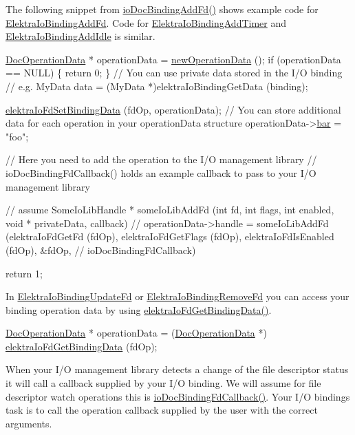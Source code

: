 The following snippet from \hyperlink{io__doc_8c_ae9b5f4e891829f3af8563e8160e1bd02}{io\+Doc\+Binding\+Add\+Fd()} shows example code for \hyperlink{kdbio_8h_addbfc876a15d0b8864196c67ab3e5a26}{Elektra\+Io\+Binding\+Add\+Fd}. Code for \hyperlink{kdbio_8h_a61a8f37e371b8360c92222f58f4691eb}{Elektra\+Io\+Binding\+Add\+Timer} and \hyperlink{kdbio_8h_adcfdf9f514441cabfbfd064fe4021522}{Elektra\+Io\+Binding\+Add\+Idle} is similar.


\begin{DoxyCodeInclude}
        \hyperlink{structDocOperationData}{DocOperationData} * operationData = \hyperlink{io__doc_8c_a18494b019c975b4212d39c9d83ff1e02}{newOperationData} ();
        \textcolor{keywordflow}{if} (operationData == NULL)
        \{
                \textcolor{keywordflow}{return} 0;
        \}
        \textcolor{comment}{// You can use private data stored in the I/O binding}
        \textcolor{comment}{// e.g. MyData data = (MyData *)elektraIoBindingGetData (binding);}

        \hyperlink{io_8c_ae02ec122aafa67b7dd92d9c3daa6499e}{elektraIoFdSetBindingData} (fdOp, operationData);
        \textcolor{comment}{// You can store additional data for each operation in your operationData structure}
        operationData->\hyperlink{structDocOperationData_aae15fddcc4a8c6e7a9faaebe4f9964ec}{bar} = \textcolor{stringliteral}{"foo"};

        \textcolor{comment}{// Here you need to add the operation to the I/O management library}
        \textcolor{comment}{// ioDocBindingFdCallback() holds an example callback to pass to your I/O management library}

        \textcolor{comment}{// assume SomeIoLibHandle * someIoLibAddFd (int fd, int flags, int enabled, void * privateData,
       callback)}
        \textcolor{comment}{// operationData->handle = someIoLibAddFd (elektraIoFdGetFd (fdOp), elektraIoFdGetFlags (fdOp),
       elektraIoFdIsEnabled (fdOp), &fdOp,}
        \textcolor{comment}{// ioDocBindingFdCallback)}

        \textcolor{keywordflow}{return} 1;
\end{DoxyCodeInclude}
 In \hyperlink{kdbio_8h_acdb75b8df54c2b64980cf541b2704f37}{Elektra\+Io\+Binding\+Update\+Fd} or \hyperlink{kdbio_8h_af1d03ff367130892ec3d1f4788eb8277}{Elektra\+Io\+Binding\+Remove\+Fd} you can access your binding operation data by using \hyperlink{io_8c_a6103b457ed1440d0490acf0a6ec17386}{elektra\+Io\+Fd\+Get\+Binding\+Data()}.


\begin{DoxyCodeInclude}
        \hyperlink{structDocOperationData}{DocOperationData} * operationData = (\hyperlink{structDocOperationData}{DocOperationData} *) 
      \hyperlink{io_8c_a6103b457ed1440d0490acf0a6ec17386}{elektraIoFdGetBindingData} (fdOp);
\end{DoxyCodeInclude}
 When your I/O management library detects a change of the file descriptor status it will call a callback supplied by your I/O binding. We will assume for file descriptor watch operations this is \hyperlink{io__doc_8c_a1fce91400d38bed917cdb6dfc1bc1cf6}{io\+Doc\+Binding\+Fd\+Callback()}. Your I/O binding\textquotesingle{}s task is to call the operation callback supplied by the user with the correct arguments.


